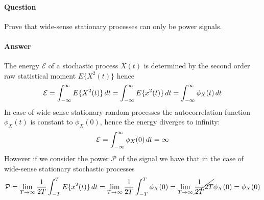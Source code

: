\newquestion
	\paragraph{Question} Prove that wide-sense stationary processes can only be power signals.
	
	\paragraph{Answer} The energy $\mathcal E$ of a stochastic process $X(t)$ is determined by the second order raw statistical moment $E\{X^2(t)\}$ hence
	\[ \mathcal E = \int_{-\infty}^\infty E\{ X^2(t) \} \,dt = \int_{-\infty}^\infty E\{x^2(t)\}\, dt = \int_{-\infty}^\infty \phi_X(t)\, dt \]
	In case of wide-sense stationary random processes the autocorrelation function $\phi_X(t)$ is constant to $\phi_X(0)$, hence the energy diverges to infinity:
	\[ \mathcal E = \int_{-\infty}^\infty \phi_X(0)\, dt = \infty  \]
	However if we consider the power $\mathcal P$ of the signal we have that in the case of wide-sense stationary stochastic processes
	\[ \mathcal P = \lim_{T\rightarrow \infty} \frac 1{2T} \int_{-T}^T E\{x^2(t)\} \, dt = \lim_{T\rightarrow \infty} \frac 1{2T} \int_{-T}^T \phi_X(0) = \lim_{T\rightarrow \infty}  \cancel{\frac 1 {2T} 2T}\phi_X(0) = \phi_X(0) \]
	
	
	
	
	
	
	
	
	
	
	
	
	
	
	